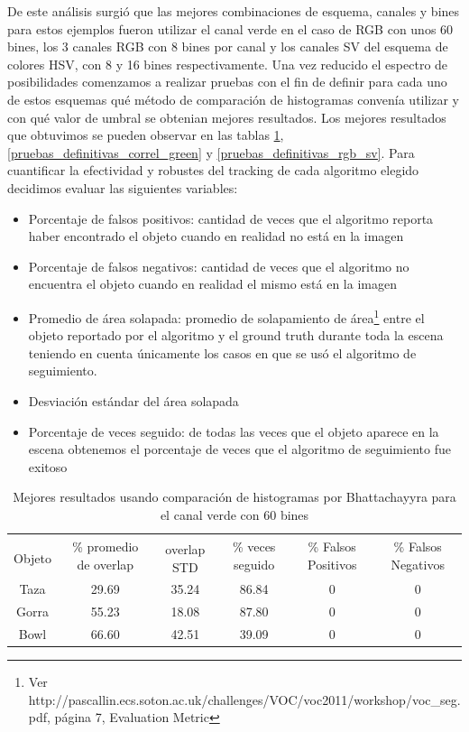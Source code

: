 De este análisis surgió que las mejores combinaciones de esquema, canales y bines para estos ejemplos fueron utilizar el canal verde en el caso de RGB con unos 60 bines, los 3 canales RGB con 8 bines por canal  y los canales SV del esquema de colores HSV, con 8 y 16 bines respectivamente. Una vez reducido el espectro de posibilidades comenzamos a realizar pruebas con el fin de definir para cada uno de estos esquemas qué método de comparación de histogramas convenía utilizar y con qué valor de umbral se obtenian mejores resultados. Los mejores resultados que obtuvimos se pueden observar en las tablas \ref{pruebas_definitivas_bhatta_green}, \ref{pruebas_definitivas_correl_green} y \ref{pruebas_definitivas_rgb_sv}. Para cuantificar la efectividad y robustes del tracking de cada algoritmo elegido decidimos evaluar las siguientes variables:
\begin{itemize}
	\item Porcentaje de falsos positivos: cantidad de veces que el algoritmo reporta haber encontrado el objeto cuando en realidad no está en la imagen
	\item Porcentaje de falsos negativos: cantidad de veces que el algoritmo no encuentra el objeto cuando en realidad el mismo está en la imagen
	\item Promedio de área solapada: promedio de solapamiento de área\footnote{Ver http://pascallin.ecs.soton.ac.uk/challenges/VOC/voc2011/workshop/voc\_seg.pdf, página 7, Evaluation Metric} entre el objeto reportado por el algoritmo y el ground truth durante toda la escena teniendo en cuenta únicamente los casos en que se usó el algoritmo de seguimiento.
	\item Desviación estándar del área solapada
	\item Porcentaje de veces seguido: de todas las veces que el objeto aparece en la escena obtenemos el porcentaje de veces que el algoritmo de seguimiento fue exitoso	
\end{itemize}

\begin{table}
	\begin{tabular}{|c|c|c|c|c|c|}
	    \hline
	    & \multirow{2}{2.4cm}{\% promedio de overlap} & & \multirow{2}{2cm}{\% veces seguido} & \multirow{2}{1.6cm}{\% Falsos Positivos} & \multirow{2}{1.6cm}{\% Falsos Negativos}\\
		Objeto & & overlap STD & & &\\
	    \hline
	    Taza   & 29.69      & 35.24       & 86.84             & 0                & 0\\
	    \hline
	    Gorra  & 55.23      & 18.08       & 87.80             & 0                & 0\\
	    \hline
	    Bowl   & 66.60      & 42.51       & 39.09             & 0                & 0\\
	    \hline
    \end{tabular}
	\caption{Mejores resultados usando comparación de histogramas por Bhattachayyra para el canal verde con 60 bines}
	\label{pruebas_definitivas_bhatta_green}
\end{table}

